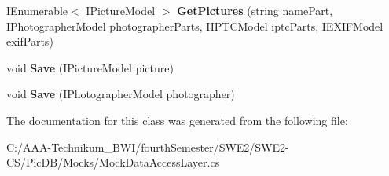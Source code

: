 \begin{DoxyCompactItemize}
I\+Enumerable$<$ I\+Picture\+Model $>$ {\bfseries Get\+Pictures} (string name\+Part, I\+Photographer\+Model photographer\+Parts, I\+I\+P\+T\+C\+Model iptc\+Parts, I\+E\+X\+I\+F\+Model exif\+Parts)
\item 
\mbox{\label{class_pic_d_b_1_1_mocks_1_1_mock_data_access_layer_ae31343b2301b4f7056a77c6514703fff}} 
void {\bfseries Save} (I\+Picture\+Model picture)
\item 
\mbox{\label{class_pic_d_b_1_1_mocks_1_1_mock_data_access_layer_ae024d7c16c980db4f0ef8a73ab632663}} 
void {\bfseries Save} (I\+Photographer\+Model photographer)
\end{DoxyCompactItemize}


The documentation for this class was generated from the following file\+:\begin{DoxyCompactItemize}
\item 
C\+:/\+A\+A\+A-\/\+Technikum\+\_\+\+B\+W\+I/fourth\+Semester/\+S\+W\+E2/\+S\+W\+E2-\/\+C\+S/\+Pic\+D\+B/\+Mocks/Mock\+Data\+Access\+Layer.\+cs\end{DoxyCompactItemize}
